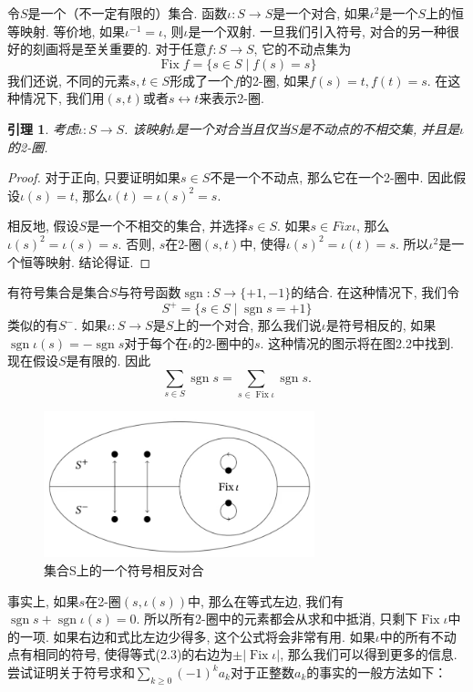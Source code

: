 \documentclass{ctexbook}
\newtheorem{lem}[thm]{引理}
\begin{document}
	令$S$是一个（不一定有限的）集合. 函数$\iota:S\rightarrow S$是一个对合, 如果$\iota^2$是一个$S$上的恒等映射. 等价地, 如果$\iota^{-1}=\iota$, 则$\iota$是一个双射. 一旦我们引入符号, 对合的另一种很好的刻画将是至关重要的. 对于任意$f:S\rightarrow S$, 它的不动点集为
\[
	\operatorname{Fix}f=\{s\in S\mid f(s)=s\}
\]
	我们还说, 不同的元素$s,t\in S$形成了一个$f$的2-圈, 如果$f(s)=t,f(t)=s$.
	在这种情况下, 我们用$(s,t)$或者$s\leftrightarrow t$来表示2-圈.

\begin{lem}
	考虑$\iota:S\rightarrow S$. 该映射$\iota$是一个对合当且仅当$S$是不动点的不相交集, 并且是$\iota$的2-圈.
\end{lem}
\begin{proof}
	对于正向, 只要证明如果$s\in S$不是一个不动点, 那么它在一个2-圈中. 因此假设$\iota(s)=t$, 那么$\iota(t)=\iota(s)^2=s$.
	
	相反地, 假设$S$是一个不相交的集合, 并选择$s\in S$. 如果$s\in Fix\iota$, 那么$\iota(s)^2=\iota(s)=s$. 否则, $s$在2-圈$(s,t)$中, 使得$\iota(s)^2=\iota(t)=s$. 所以$\iota^2$是一个恒等映射. 结论得证.
\end{proof}

	有符号集合是集合$S$与符号函数$\operatorname{sgn}:S\rightarrow\{+1,-1\}$的结合. 在这种情况下, 我们令
\[
	S^{+}=\{s\in S\mid \operatorname{sgn}s=+1\}
\]
	类似的有$S^{-}$. 如果$\iota :S\rightarrow S$是$S$上的一个对合, 那么我们说$\iota$是符号相反的, 如果$\operatorname{sgn}\iota (s)=-\operatorname{sgn}s$对于每个在$\iota$的2-圈中的$s$. 这种情况的图示将在图2.2中找到. 现在假设$S$是有限的. 因此
\begin{equation}
\sum_{s\in S}\operatorname{sgn}s=\sum_{s\in \operatorname{Fix}\iota}\operatorname{sgn}s .
\end{equation}
\begin{figure}[htbp]
	\centering
	\includegraphics*[width=0.7\textwidth]{./fig2/2.jpg}
	\caption{集合S上的一个符号相反对合}
\end{figure}
	事实上, 如果$s$在2-圈$(s,\iota(s))$中, 那么在等式左边, 我们有$\operatorname{sgn}s+\operatorname{sgn}\iota(s)=0$. 所以所有2-圈中的元素都会从求和中抵消, 只剩下$\operatorname{Fix}\iota$中的一项. 如果右边和式比左边少得多, 这个公式将会非常有用. 如果$\iota$中的所有不动点有相同的符号, 使得等式(2.3)的右边为$\pm|\operatorname{Fix}\iota|$, 那么我们可以得到更多的信息. 尝试证明关于符号求和$\sum_{k\geq 0}(-1)^{k}a_{k}$对于正整数$a_{k}$的事实的一般方法如下：
\end{document}
